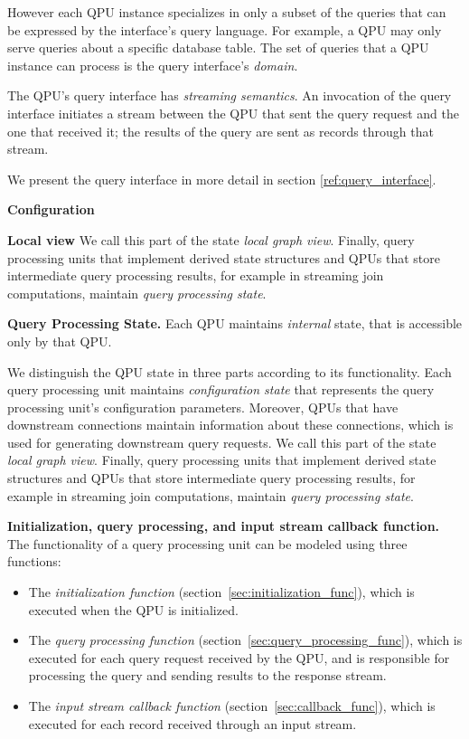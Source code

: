 However each QPU instance specializes in only a subset of the queries that can be expressed by the interface's query
language.
For example, a QPU may only serve queries about a specific database table.
The set of queries that a QPU instance can process is the query interface's \textit{domain}.

The QPU's query interface has \textit{streaming semantics}.
An invocation of the query interface initiates a stream between the QPU that sent the query request and the one that
received it;
the results of the query are sent as records through that stream.

We present the query interface in more detail in section \ref{ref:query_interface}.

\medskip
\noindent
\textbf{Configuration}

\medskip
\noindent
\textbf{Local view}
We call this part of the state \textit{local graph view}.
Finally, query processing units that implement derived state structures and QPUs that store intermediate query processing
results, for example in streaming join computations, maintain \textit{query processing state}.

\medskip
\noindent
\textbf{Query Processing State.}
Each QPU maintains \textit{internal} state, that is accessible only by that QPU.

We distinguish the QPU state in three parts according to its functionality.
Each query processing unit maintains \textit{configuration state} that represents the query processing unit's
configuration parameters.
Moreover, QPUs that have downstream connections maintain information about these connections, which is
used for generating downstream query requests.
We call this part of the state \textit{local graph view}.
Finally, query processing units that implement derived state structures and QPUs that store intermediate query processing
results, for example in streaming join computations, maintain \textit{query processing state}.

\medskip
\noindent
\textbf{Initialization, query processing, and input stream callback function.}
The functionality of a query processing unit can be modeled using three functions:
\begin{itemize}
  \item The \textit{initialization function} (section~\ref{sec:initialization_func}), which is executed when the QPU is
  initialized.

  \item The \textit{query processing function} (section~\ref{sec:query_processing_func}), which is executed for each
  query request received by the QPU, and is responsible for processing the query and sending results to the response stream.

  \item The \textit{input stream callback function} (section~\ref{sec:callback_func}), which is executed for each record
  received through an input stream.

\end{itemize}

